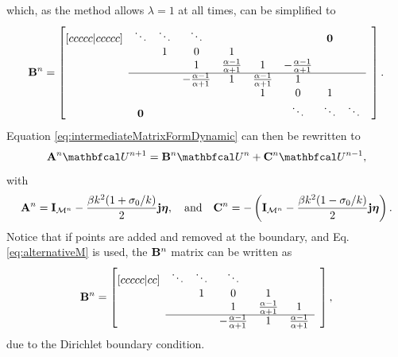 which, as the method allows $\lambda = 1$ at all times, can be simplified to
\begin{equation}\label{eq:quadMat}
    \mathbf{B}^n = \begin{bmatrix}[ccccc|ccccc]
        & \ddots& \ddots  &\ddots & & & & \mathbf{0} & & \\
        & & 1 & 0 & 1 & & & & & \\
        & & & 1 & \frac{\alpha - 1}{\alpha + 1}& 1 & -\frac{\alpha - 1}{\alpha + 1} & & \\ \cline{2-9}
        & & & -\frac{\alpha - 1}{\alpha + 1} & 1 & \frac{\alpha - 1}{\alpha + 1} & 1 & & & \\
        & & & & &1 & 0 & 1 & & \\
        & \mathbf{0} & & & &  &\ddots & \ddots &\ddots &
    \end{bmatrix}.
\end{equation}
Equation \eqref{eq:intermediateMatrixFormDynamic} can then be rewritten to 
\begin{equation}\label{eq:dynamicMatrixForm}
    \A^n \Ucal^{n+1} = \B^n \Ucal^n + \C^n\Ucal^{n-1},
\end{equation}
with
\begin{equation*}
    \mathbf{A}^n = \mathbf{I}_{\mathcal{M}^n} - \frac{\beta k^2 (1+\sigma_0/k)}{2}\mathbf{j}\boldsymbol{\eta},\quad \text{and} \quad \mathbf{C}^n = -\left(\mathbf{I}_{\mathcal{M}^n} - \frac{\beta k^2 (1-\sigma_0/k)}{2}\mathbf{j}\boldsymbol{\eta}\right).
\end{equation*}
Notice that if points are added and removed at the boundary, and Eq. \eqref{eq:alternativeM} is used, the $\mathbf{B}^n$ matrix can be written as
\begin{equation}
    \B^n = \begin{bmatrix}[ccccc|cc]
        & \ddots& \ddots  &\ddots & & & \\
        & & 1 & 0 & 1 & & \\
        & & & 1 & \frac{\alpha - 1}{\alpha + 1}& 1 & \\ \cline{2-6}
        & & & -\frac{\alpha - 1}{\alpha + 1} & 1 & \frac{\alpha - 1}{\alpha + 1} &
    \end{bmatrix},
\end{equation}
due to the Dirichlet boundary condition.
